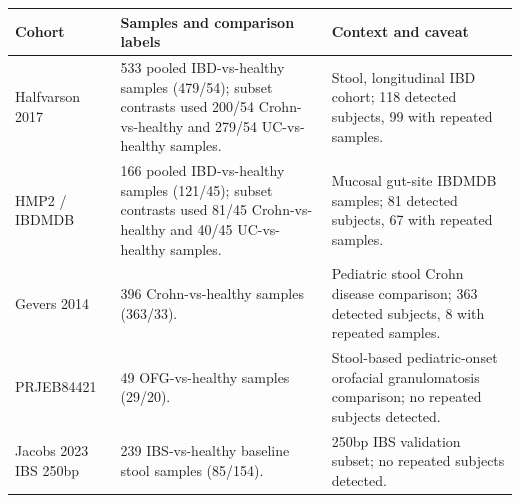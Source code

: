 \begin{center}
\scriptsize
\begin{tabularx}{\textwidth}{@{} l Y Y @{}}
\toprule
Cohort & Samples and comparison labels & Context and caveat
 \\
\midrule
Halfvarson 2017 & 533 pooled IBD-vs-healthy samples (479/54); subset contrasts used 200/54 Crohn-vs-healthy and 279/54 UC-vs-healthy samples. & Stool, longitudinal IBD cohort; 118 detected subjects, 99 with repeated samples. \\
HMP2 / IBDMDB & 166 pooled IBD-vs-healthy samples (121/45); subset contrasts used 81/45 Crohn-vs-healthy and 40/45 UC-vs-healthy samples. & Mucosal gut-site IBDMDB samples; 81 detected subjects, 67 with repeated samples. \\
Gevers 2014 & 396 Crohn-vs-healthy samples (363/33). & Pediatric stool Crohn disease comparison; 363 detected subjects, 8 with repeated samples. \\
PRJEB84421 & 49 OFG-vs-healthy samples (29/20). & Stool-based pediatric-onset orofacial granulomatosis comparison; no repeated subjects detected. \\
Jacobs 2023 IBS 250bp & 239 IBS-vs-healthy baseline stool samples (85/154). & 250bp IBS validation subset; no repeated subjects detected. \\
\bottomrule
\end{tabularx}
\end{center}
